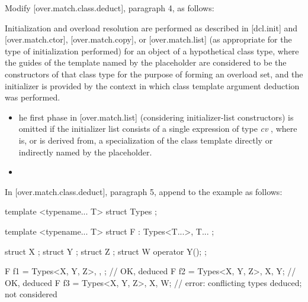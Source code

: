 Modify [over.match.class.deduct], paragraph 4, as follows:

\begin{adjustwidth}{0.9cm}{0.9cm}
Initialization and overload resolution are performed as described in [dcl.init] and [over.match.ctor], [over.match.copy], or [over.match.list] (as appropriate for the type of initialization performed) for an object of a hypothetical class type, where the guides of the template named by the placeholder are considered to be the constructors of that class type for the purpose of forming an overload set, and the initializer is provided by the context in which class template argument deduction was performed.
\begin{itemize}
\item {}he first phase in [over.match.list] (considering initializer-list constructors) is omitted if the initializer list consists of a single expression of type \emph{cv} , where  is, or is derived from, a specialization of the class template directly or indirectly named by the placeholder.
\item {}
\end{itemize}
\end{adjustwidth}

In [over.match.class.deduct], paragraph 5, append to the example as follows:

\begin{adjustwidth}{0.5cm}{0.5cm}
\begin{addedblock}
\begin{codeblock}
template <typename... T> 
struct Types {};

template <typename... T>
struct F : Types<T...>, T... {};

struct X {};
struct Y {};
struct Z {};
struct W { operator Y(); };

F f1 = {Types<X, Y, Z>{}, {}, {}};    // OK,  deduced
F f2 = {Types<X, Y, Z>{}, X{}, Y{}};  // OK,  deduced
F f3 = {Types<X, Y, Z>{}, X{}, W{}};  // error: conflicting types deduced;  not considered
\end{codeblock}
\end{addedblock}
\end{adjustwidth}

